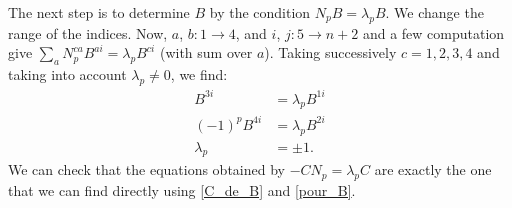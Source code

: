 The next step is to determine $B$ by the condition $N_pB=\lambda_p B$. We change the range of the indices. Now, $a$, $b:1\rightarrow 4$, and $i$, $j:5\rightarrow n+2$ and a few computation give $\sum_{a}^{}N_p^{ca}B^{ai}=\lambda_pB^{ci}$ (with sum over $a$). Taking successively $c=1,2,3,4$ and taking into account $\lambda_p\neq 0$, we find:
\begin{subequations}\label{pour_B}
	\begin{align}
		B^{3i}       & =\lambda_pB^{1i} \\
		(-1)^pB^{4i} & =\lambda_pB^{2i} \\
		\lambda_p    & =\pm 1.
	\end{align}
\end{subequations}
We can check that the equations obtained by $-CN_p=\lambda_pC$ are exactly the one that we can find directly using \eqref{C_de_B} and \eqref{pour_B}.

